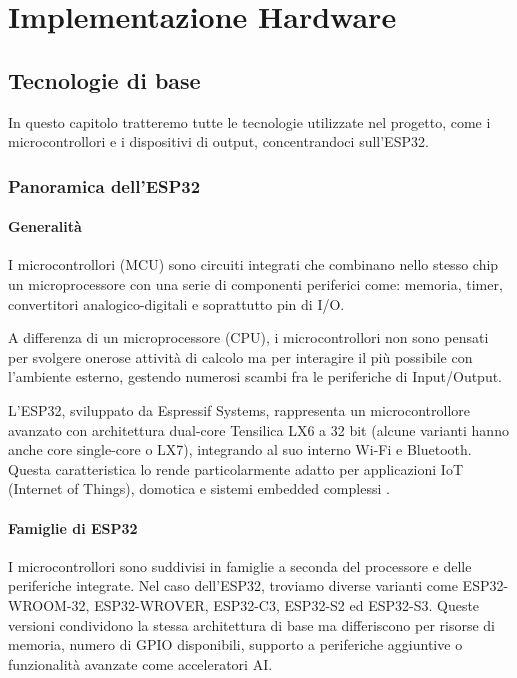 \chapter{Implementazione Hardware}
\label{chap:implementazione_hardware}
\section{Tecnologie di base}

In questo capitolo tratteremo tutte le tecnologie utilizzate nel progetto, come i microcontrollori e i dispositivi di output,
 concentrandoci sull’ESP32.

\subsection{Panoramica dell’ESP32}

\subsubsection{Generalità}
I microcontrollori (MCU) sono circuiti integrati che combinano nello stesso chip un microprocessore con una serie di componenti periferici
 come: memoria, timer, convertitori analogico-digitali e soprattutto pin di I/O.

A differenza di un microprocessore (CPU), i microcontrollori non sono pensati per svolgere onerose attività di calcolo ma per interagire 
il più possibile con l’ambiente esterno, gestendo numerosi scambi fra le periferiche di Input/Output.

L’ESP32, sviluppato da Espressif Systems, rappresenta un microcontrollore avanzato con architettura dual-core Tensilica LX6 a 32 bit
 (alcune varianti hanno anche core single-core o LX7), integrando al suo interno Wi-Fi e Bluetooth. Questa caratteristica
  lo rende particolarmente adatto per applicazioni IoT (Internet of Things), domotica e sistemi embedded complessi \citep{esp32techref}.

\subsubsection{Famiglie di ESP32}
I microcontrollori sono suddivisi in famiglie a seconda del processore e delle periferiche integrate. Nel caso dell’ESP32,
 troviamo diverse varianti come ESP32-WROOM-32, ESP32-WROVER, ESP32-C3, ESP32-S2 ed ESP32-S3.  
Queste versioni condividono la stessa architettura di base ma differiscono per risorse di memoria, numero di GPIO disponibili,
 supporto a periferiche aggiuntive o funzionalità avanzate come acceleratori AI.  

